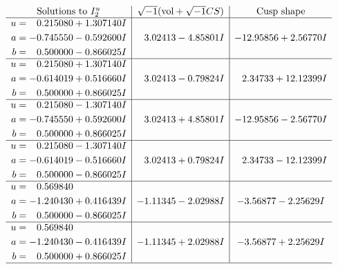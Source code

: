 \documentclass[1p]{elsarticle_modified}
\theoremstyle{definition}
\newcommand{\I}{\sqrt{-1}}
\begin{document}
$$\begin{array}{c|c|c}  
\text{Solutions to }I^u_{2}& \I (\text{vol} + \sqrt{-1}CS) & \text{Cusp shape}\\
 \hline 
\begin{aligned}
u &= \phantom{-}0.215080 + 1.307140 I \\
a &= -0.745550 - 0.592600 I \\
b &= \phantom{-}0.500000 - 0.866025 I\end{aligned}
 & \phantom{-}3.02413 - 4.85801 I & -12.95856 + 2.56770 I \\ \hline\begin{aligned}
u &= \phantom{-}0.215080 + 1.307140 I \\
a &= -0.614019 + 0.516660 I \\
b &= \phantom{-}0.500000 + 0.866025 I\end{aligned}
 & \phantom{-}3.02413 - 0.79824 I & \phantom{-}2.34733 + 12.12399 I \\ \hline\begin{aligned}
u &= \phantom{-}0.215080 - 1.307140 I \\
a &= -0.745550 + 0.592600 I \\
b &= \phantom{-}0.500000 + 0.866025 I\end{aligned}
 & \phantom{-}3.02413 + 4.85801 I & -12.95856 - 2.56770 I \\ \hline\begin{aligned}
u &= \phantom{-}0.215080 - 1.307140 I \\
a &= -0.614019 - 0.516660 I \\
b &= \phantom{-}0.500000 - 0.866025 I\end{aligned}
 & \phantom{-}3.02413 + 0.79824 I & \phantom{-}2.34733 - 12.12399 I \\ \hline\begin{aligned}
u &= \phantom{-}0.569840\phantom{ +0.000000I} \\
a &= -1.240430 + 0.416439 I \\
b &= \phantom{-}0.500000 - 0.866025 I\end{aligned}
 & -1.11345 - 2.02988 I & -3.56877 - 2.25629 I \\ \hline\begin{aligned}
u &= \phantom{-}0.569840\phantom{ +0.000000I} \\
a &= -1.240430 - 0.416439 I \\
b &= \phantom{-}0.500000 + 0.866025 I\end{aligned}
 & -1.11345 + 2.02988 I & -3.56877 + 2.25629 I\\
 \hline 
 \end{array}$$\newpage
\end{document}

